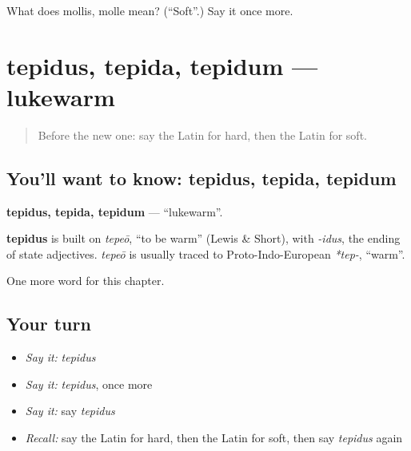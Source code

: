 \begin{tcolorbox}[breakable,colback=teal!4,colframe=teal!35!black,title={Before you move on}]
What does mollis, molle mean? (\textquotedblleft{}Soft\textquotedblright{}.) Say it once more.
\end{tcolorbox}
\section[tepidus, tepida, tepidum]{tepidus, tepida, tepidum — lukewarm}

\label{lesson:LA-C143-tepidus}



\begin{quote}
Before the new one: say the Latin for hard, then the Latin for soft.
\end{quote}

\subsection*{You'll want to know: tepidus, tepida, tepidum}
\textbf{tepidus, tepida, tepidum} — \textquotedblleft{}lukewarm\textquotedblright{}.

\begin{cousinweb}
\textbf{tepidus} is built on \emph{tepeō}, \textquotedblleft{}to be warm\textquotedblright{} (Lewis \& Short), with \emph{-idus}, the ending of state adjectives. \emph{tepeō} is usually traced to Proto-Indo-European \emph{*tep-}, \textquotedblleft{}warm\textquotedblright{}.
\end{cousinweb}

\begin{grammarlens}[title={What you've built}]
One more word for this chapter.
\end{grammarlens}

\subsection*{Your turn}
\begin{itemize}
\raggedright
  \item \emph{Say it:} \emph{tepidus}
  \item \emph{Say it:} \emph{tepidus}, once more
  \item \emph{Say it:} say \emph{tepidus}
  \item \emph{Recall:} say the Latin for hard, then the Latin for soft, then say \emph{tepidus} again
\end{itemize}


